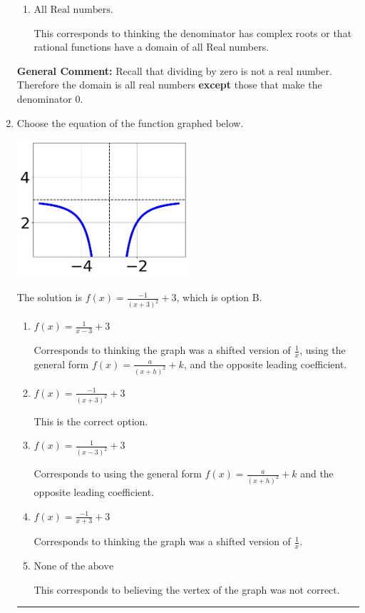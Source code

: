 \documentclass{extbook}[14pt]
\newcommand{\litem}[1]{\item #1

\rule{\textwidth}{0.4pt}}
\begin{document}
\begin{enumerate}
{\begin{enumerate}[label=\Alph*.]
All Real numbers except $x = -1.250$ and $x = 1.200$, which is the correct option.
\item \( \text{All Real numbers.} \)

This corresponds to thinking the denominator has complex roots or that rational functions have a domain of all Real numbers.
\end{enumerate}

\textbf{General Comment:} Recall that dividing by zero is not a real number. Therefore the domain is all real numbers \textbf{except} those that make the denominator 0.
}
\litem{
Choose the equation of the function graphed below.

\begin{center}
    \includegraphics[width=0.5\textwidth]{../Figures/rationalGraphToEquationCopyC.png}
\end{center}


The solution is \( f(x) = \frac{-1}{(x + 3)^2} + 3 \), which is option B.\begin{enumerate}[label=\Alph*.]
\item \( f(x) = \frac{1}{x - 3} + 3 \)

Corresponds to thinking the graph was a shifted version of $\frac{1}{x}$, using the general form $f(x) = \frac{a}{(x+h)^2}+k$, and the opposite leading coefficient.
\item \( f(x) = \frac{-1}{(x + 3)^2} + 3 \)

This is the correct option.
\item \( f(x) = \frac{1}{(x - 3)^2} + 3 \)

Corresponds to using the general form $f(x) = \frac{a}{(x+h)^2}+k$ and the opposite leading coefficient.
\item \( f(x) = \frac{-1}{x + 3} + 3 \)

Corresponds to thinking the graph was a shifted version of $\frac{1}{x}$.
\item \( \text{None of the above} \)

This corresponds to believing the vertex of the graph was not correct.
\end{enumerate}

}
\end{enumerate}
\end{document}
